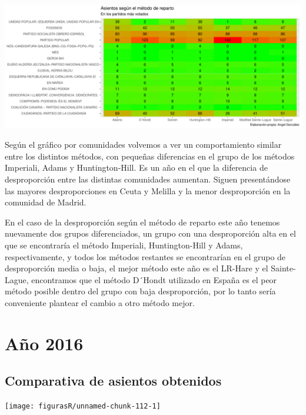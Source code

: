 \documentclass[12pt,a4paper,]{book}
\numberwithin{dummy}{section}
\theoremstyle{ocrenumbox}
\theoremstyle{blacknumex}
\theoremstyle{blacknumbox}
\theoremstyle{ocrenum}
\theoremstyle{ocrenum}
\begin{document}
\begin{center}\includegraphics[width=1\linewidth]{figurasR/unnamed-chunk-110-2} \end{center}

Según el gráfico por comunidades volvemos a ver un comportamiento
similar entre los distintos métodos, con pequeñas diferencias en el
grupo de los métodos Imperiali, Adams y Huntington-Hill. Es un año en el
que la diferencia de desproporción entre las distintas comunidades
aumentan. Siguen presentándose las mayores desproporciones en Ceuta y
Melilla y la menor desproporción en la comunidad de Madrid.

En el caso de la desproporción según el método de reparto este año
tenemos nuevamente dos grupos diferenciados, un grupo con una
desproporción alta en el que se encontraría el método Imperiali,
Huntington-Hill y Adams, respectivamente, y todos los métodos restantes
se encontrarían en el grupo de desproporción media o baja, el mejor
método este año es el LR-Hare y el Sainte-Lague, encontramos que el
método D´Hondt utilizado en España es el peor método posible dentro del
grupo con baja desproporción, por lo tanto sería conveniente plantear el
cambio a otro método mejor.

\hypertarget{auxf1o-2016}{%
\section{Año 2016}\label{auxf1o-2016}}

\hypertarget{comparativa-de-asientos-obtenidos-12}{%
\subsection{Comparativa de asientos
obtenidos}\label{comparativa-de-asientos-obtenidos-12}}

\begin{center}\texttt{[image: figurasR/unnamed-chunk-112-1]} \end{center}
\end{document}
